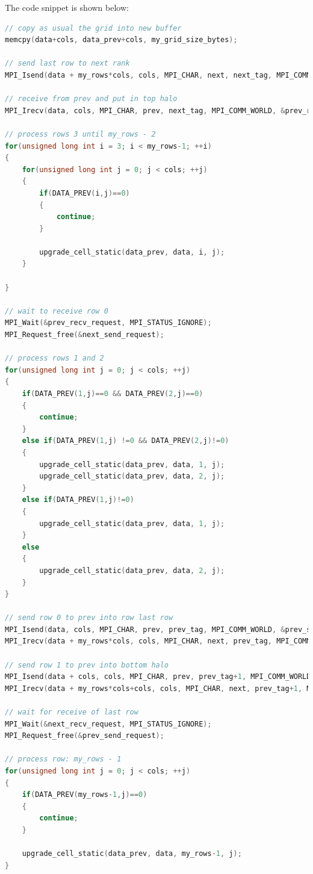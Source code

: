 \documentclass{report}
\begin{document}
The code snippet is shown below:

\begin{lstlisting}[language=C++]
// copy as usual the grid into new buffer
memcpy(data+cols, data_prev+cols, my_grid_size_bytes);

// send last row to next rank
MPI_Isend(data + my_rows*cols, cols, MPI_CHAR, next, next_tag, MPI_COMM_WORLD, &next_send_request);

// receive from prev and put in top halo
MPI_Irecv(data, cols, MPI_CHAR, prev, next_tag, MPI_COMM_WORLD, &prev_recv_request);

// process rows 3 until my_rows - 2
for(unsigned long int i = 3; i < my_rows-1; ++i)
{
    for(unsigned long int j = 0; j < cols; ++j)
    {
        if(DATA_PREV(i,j)==0)
        {
            continue;
        }

        upgrade_cell_static(data_prev, data, i, j);
    }

}

// wait to receive row 0
MPI_Wait(&prev_recv_request, MPI_STATUS_IGNORE);
MPI_Request_free(&next_send_request);

// process rows 1 and 2
for(unsigned long int j = 0; j < cols; ++j)
{
    if(DATA_PREV(1,j)==0 && DATA_PREV(2,j)==0)
    {
        continue;
    }
    else if(DATA_PREV(1,j) !=0 && DATA_PREV(2,j)!=0)
    {
        upgrade_cell_static(data_prev, data, 1, j);
        upgrade_cell_static(data_prev, data, 2, j);
    }
    else if(DATA_PREV(1,j)!=0)
    {
        upgrade_cell_static(data_prev, data, 1, j);
    }
    else
    {
        upgrade_cell_static(data_prev, data, 2, j);
    }
}
    
// send row 0 to prev into row last row
MPI_Isend(data, cols, MPI_CHAR, prev, prev_tag, MPI_COMM_WORLD, &prev_send_request);
MPI_Irecv(data + my_rows*cols, cols, MPI_CHAR, next, prev_tag, MPI_COMM_WORLD, &next_recv_request);

// send row 1 to prev into bottom halo
MPI_Isend(data + cols, cols, MPI_CHAR, prev, prev_tag+1, MPI_COMM_WORLD, &prev_send_request1);
MPI_Irecv(data + my_rows*cols+cols, cols, MPI_CHAR, next, prev_tag+1, MPI_COMM_WORLD, &next_recv_request1);

// wait for receive of last row
MPI_Wait(&next_recv_request, MPI_STATUS_IGNORE);
MPI_Request_free(&prev_send_request);

// process row: my_rows - 1
for(unsigned long int j = 0; j < cols; ++j)
{
    if(DATA_PREV(my_rows-1,j)==0)
    {
        continue;
    }

    upgrade_cell_static(data_prev, data, my_rows-1, j);
}


\end{lstlisting}
\end{document}
